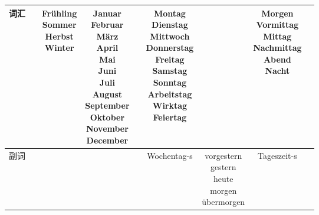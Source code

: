\begin{center}
\begin{tabular}{|c|c|c|c|c|c|c|c|c|}
        词汇 &                         & \makecell{Frühling                                                                                                                                                    \\ Sommer \\ Herbst \\ Winter}                       & \makecell{Januar \\ Februar \\ März \\ April \\ Mai \\ Juni \\ Juli \\ August \\ September \\ Oktober \\ November \\ December}                       &                       & \makecell{Montag \\ Dienstag \\ Mittwoch \\ Donnerstag \\ Freitag \\ Samstag \\ Sonntag \\ Arbeitstag \\ Wirktag \\ Feiertag} & & \makecell{Morgen \\ Vormittag \\ Mittag \\ Nachmittag \\ Abend \\ Nacht} &                                                                                      \\
        \hline
        副词 & \multicolumn{4}{c|}{~}  & Wochentag-s             & \makecell{vorgestern                                                                                                                        \\ gestern \\ heute \\ morgen \\ übermorgen}            & Tageszeit-s &                                                                                          \\
        \hline
    \end{tabular}
\end{center}

